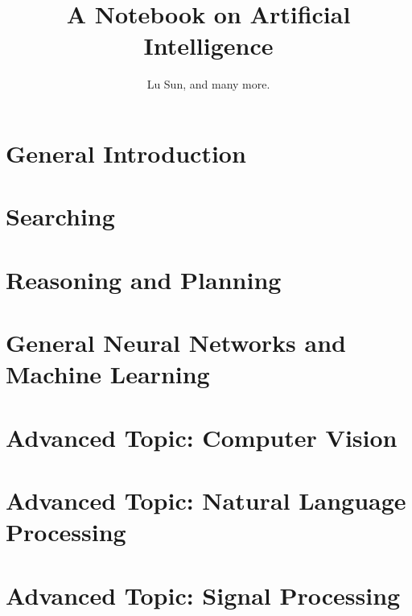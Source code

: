 



\makeindex



\frontmatter

\title{A Notebook on Artificial Intelligence}
\author{Lu Sun, and many more.}

\maketitle


\tableofcontents


\listoffigures
\listoftables

\mainmatter

\part{General Introduction}

\part{Searching}

\part{Reasoning and Planning}

\part{General Neural Networks and Machine Learning}







\part{Advanced Topic: Computer Vision}

\part{Advanced Topic: Natural Language Processing}

\part{Advanced Topic: Signal Processing}




\printindex


